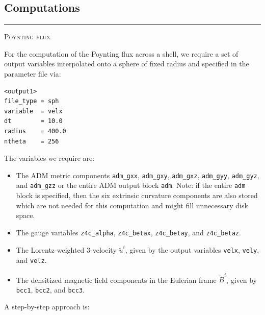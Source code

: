 \documentclass{article}
\newcommand{\var}[1]{%
  {\setlength{\fboxsep}{1.5pt}%
   \colorbox{varbg}{\textcolor{varfg}{\texttt{\small #1}}}}}
\newcommand{\step}[1]{%
  \par\medskip\noindent
  {\color{stepfg}\rule[-0.15ex]{2pt}{1.5ex}\hspace{0.5em}\scshape #1}%
  \hspace{0.75em}\ignorespaces}
\begin{document}
\subsection*{Computations}
\step{Poynting flux}
For the computation of the Poynting flux across a shell, we require a set of output variables interpolated onto a sphere
of fixed radius and specified in the parameter file via:
\begin{verbatim}
<output1>
file_type = sph
variable  = velx
dt        = 10.0
radius    = 400.0
ntheta    = 256
\end{verbatim}
The variables we require are:
\begin{itemize}
  \item The ADM metric components \var{adm\_gxx}, \var{adm\_gxy}, \var{adm\_gxz},
  \var{adm\_gyy}, \var{adm\_gyz}, and \var{adm\_gzz} or the entire ADM output block \var{adm}. Note:
  if the entire \var{adm} block is specified, then the six extrinsic curvature components are also
  stored which are not needed for this computation and might fill unnecessary disk space.
  \item The gauge variables \var{z4c\_alpha}, \var{z4c\_betax}, \var{z4c\_betay}, and \var{z4c\_betaz}.
  \item The Lorentz-weighted 3-velocity $\tilde{u}^i$, given by the output variables \var{velx}, \var{vely}, and
  \var{velz}.
  \item The densitized magnetic field components in the Eulerian frame $\tilde{B}^i$, given by \var{bcc1}, \var{bcc2}, and
  \var{bcc3}.
\end{itemize}
A step-by-step approach is:
\end{document}

